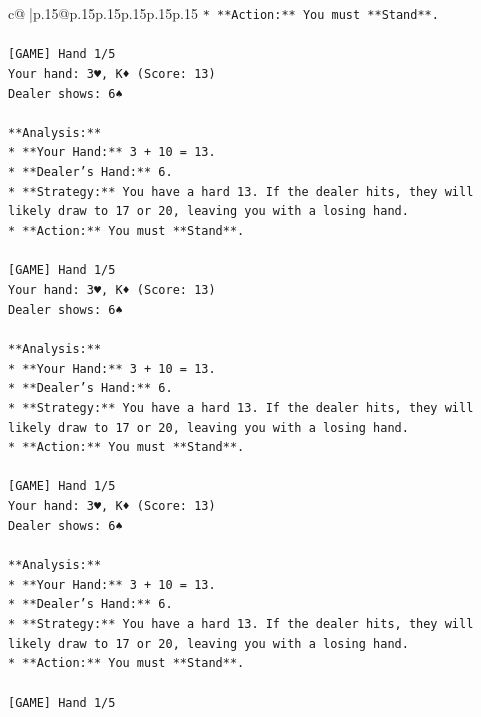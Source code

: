 \documentclass{article}
\begin{document}
{\begin{supertabular}{c@{$\;$}|p{.15\linewidth}@{}p{.15\linewidth}p{.15\linewidth}p{.15\linewidth}p{.15\linewidth}p{.15\linewidth}}
{{{\texttt{*   **Action:** You must **Stand**.} \\
\\ 
\texttt{{[}GAME{]} Hand 1/5} \\
\texttt{Your hand: 3♥, K♦ (Score: 13)} \\
\texttt{Dealer shows: 6♠} \\
\\ 
\texttt{**Analysis:**} \\
\texttt{*   **Your Hand:** 3 + 10 = 13.} \\
\texttt{*   **Dealer's Hand:** 6.} \\
\texttt{*   **Strategy:** You have a hard 13. If the dealer hits, they will likely draw to 17 or 20, leaving you with a losing hand.} \\
\texttt{*   **Action:** You must **Stand**.} \\
\\ 
\texttt{{[}GAME{]} Hand 1/5} \\
\texttt{Your hand: 3♥, K♦ (Score: 13)} \\
\texttt{Dealer shows: 6♠} \\
\\ 
\texttt{**Analysis:**} \\
\texttt{*   **Your Hand:** 3 + 10 = 13.} \\
\texttt{*   **Dealer's Hand:** 6.} \\
\texttt{*   **Strategy:** You have a hard 13. If the dealer hits, they will likely draw to 17 or 20, leaving you with a losing hand.} \\
\texttt{*   **Action:** You must **Stand**.} \\
\\ 
\texttt{{[}GAME{]} Hand 1/5} \\
\texttt{Your hand: 3♥, K♦ (Score: 13)} \\
\texttt{Dealer shows: 6♠} \\
\\ 
\texttt{**Analysis:**} \\
\texttt{*   **Your Hand:** 3 + 10 = 13.} \\
\texttt{*   **Dealer's Hand:** 6.} \\
\texttt{*   **Strategy:** You have a hard 13. If the dealer hits, they will likely draw to 17 or 20, leaving you with a losing hand.} \\
\texttt{*   **Action:** You must **Stand**.} \\
\\ 
\texttt{{[}GAME{]} Hand 1/5} \\
}}}
\end{supertabular}}
\end{document}
